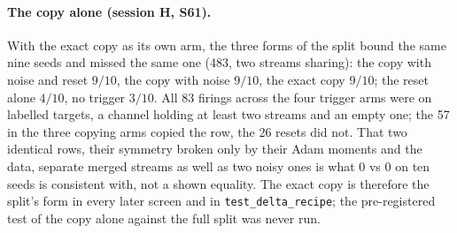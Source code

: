 \documentclass[11pt]{article}
\begin{document}
\paragraph{The copy alone (session H, S61).} With the exact copy as its own arm, the three forms of the split bound the same nine seeds and missed the same one (483, two streams sharing): the copy with noise and reset $9/10$, the copy with noise $9/10$, the exact copy $9/10$; the reset alone $4/10$, no trigger $3/10$. All 83 firings across the four trigger arms were on labelled targets, a channel holding at least two streams and an empty one; the 57 in the three copying arms copied the row, the 26 resets did not. That two identical rows, their symmetry broken only by their Adam moments and the data, separate merged streams as well as two noisy ones is what 0 vs 0 on ten seeds is consistent with, not a shown equality. The exact copy is therefore the split's form in every later screen and in \texttt{test\_delta\_recipe}; the pre-registered test of the copy alone against the full split was never run.
\end{document}

